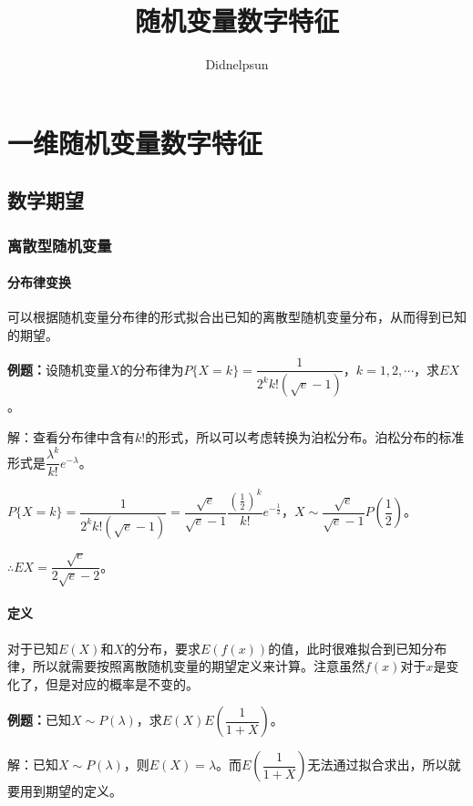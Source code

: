 \documentclass[UTF8, 12pt]{ctexart}
\author{Didnelpsun}
\title{随机变量数字特征}
\date{}
\begin{document}
\maketitle
\pagestyle{empty}
\thispagestyle{empty}
\tableofcontents
\thispagestyle{empty}
\newpage
\pagestyle{plain}
\setcounter{page}{1}
\section{一维随机变量数字特征}

\subsection{数学期望}

\subsubsection{离散型随机变量}

\paragraph{分布律变换} \leavevmode \medskip

可以根据随机变量分布律的形式拟合出已知的离散型随机变量分布，从而得到已知的期望。

\textbf{例题：}设随机变量$X$的分布律为$P\{X=k\}=\dfrac{1}{2^kk!(\sqrt{e}-1)}$，$k=1,2,\cdots$，求$EX$。

解：查看分布律中含有$k!$的形式，所以可以考虑转换为泊松分布。泊松分布的标准形式是$\dfrac{\lambda^k}{k!}e^{-\lambda}$。

$P\{X=k\}=\dfrac{1}{2^kk!(\sqrt{e}-1)}=\dfrac{\sqrt{e}}{\sqrt{e}-1}\dfrac{\left(\frac{1}{2}\right)^k}{k!}e^{-\frac{1}{2}}$，$X\sim\dfrac{\sqrt{e}}{\sqrt{e}-1}P\left(\dfrac{1}{2}\right)$。

$\therefore EX=\dfrac{\sqrt{e}}{2\sqrt{e}-2}$。

\paragraph{定义} \leavevmode \medskip

对于已知$E(X)$和$X$的分布，要求$E(f(x))$的值，此时很难拟合到已知分布律，所以就需要按照离散随机变量的期望定义来计算。注意虽然$f(x)$对于$x$是变化了，但是对应的概率是不变的。

\textbf{例题：}已知$X\sim P(\lambda)$，求$E(X)E\left(\dfrac{1}{1+X}\right)$。

解：已知$X\sim P(\lambda)$，则$E(X)=\lambda$。而$E\left(\dfrac{1}{1+X}\right)$无法通过拟合求出，所以就要用到期望的定义。
\end{document}
